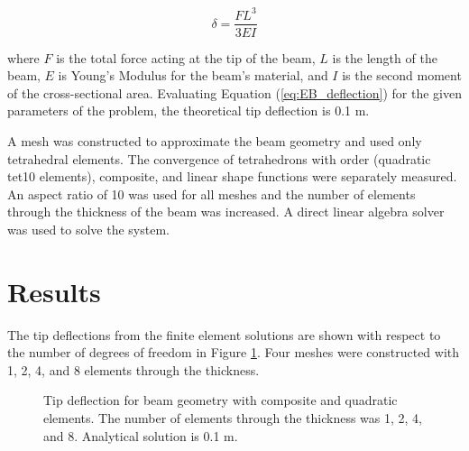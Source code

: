 \documentclass[a4paper, 12pt]{article}
\begin{document}
\begin{equation}
  \delta = \frac{F L^3}{3 E I}
  \label{eq:EB_deflection}
\end{equation}

\noindent
where 
$F$ is the total force acting at the tip of the beam, 
$L$ is the length of the beam,
$E$ is Young's Modulus for the beam's material,
and
$I$ is the second moment of the cross-sectional area.
Evaluating Equation (\ref{eq:EB_deflection}) for the
given parameters of the problem, 
the theoretical tip deflection is 0.1 m.

A mesh was constructed to approximate the beam geometry
and used only tetrahedral elements.
The convergence of 
tetrahedrons with  order (quadratic tet10 elements),
composite, and linear shape functions
were separately measured.
An aspect ratio of 10 was used for all meshes
and the number of elements through the thickness of the beam was increased.
A direct linear algebra solver was used to solve the system.

\section{Results}
The tip deflections from the finite element solutions
are shown with respect to the number of degrees of freedom 
in Figure \ref{fig:convergence}.
Four meshes were constructed with 1, 2, 4, and 8 elements
through the thickness.

\begin{figure}[H]
  \centering
  \caption{Tip deflection for beam geometry with composite and quadratic elements.
           The number of elements through the thickness was 1, 2, 4, and 8.
           Analytical solution is 0.1 m.}
  \label{fig:convergence}
\end{figure}
\end{document}

